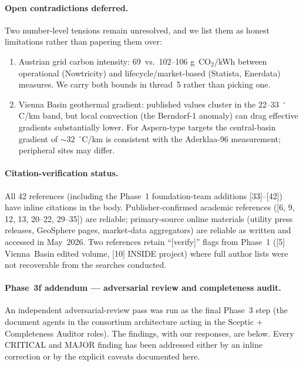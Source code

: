 \documentclass{article}
\begin{document}
\paragraph{Open contradictions deferred.} Two number-level
tensions remain unresolved, and we list them as honest
limitations rather than papering them over:
\begin{enumerate}
\item Austrian grid carbon intensity: 69~vs.\ 102--106
g~CO$_2$/kWh between operational (Nowtricity) and
lifecycle/market-based (Statista, Enerdata) measures. We carry
both bounds in thread~5 rather than picking one.
\item Vienna Basin geothermal gradient: published values cluster
in the 22--33~$^\circ$C/km band, but local convection (the
Berndorf-1 anomaly) can drag effective gradients
substantially lower. For Aspern-type targets the central-basin
gradient of $\sim 32$~$^\circ$C/km is consistent with the
Aderklaa-96 measurement; peripheral sites may differ.
\end{enumerate}

\paragraph{Citation-verification status.} All 42 references
(including the Phase~1 foundation-team additions [33]--[42])
have inline citations in the body. Publisher-confirmed academic
references ([6, 9, 12, 13, 20--22, 29--35]) are reliable;
primary-source online materials (utility press releases,
GeoSphere pages, market-data aggregators) are reliable as
written and accessed in May~2026. Two references retain
``[verify]'' flags from Phase~1 ([5] Vienna~Basin edited volume,
[10] INSIDE project) where full author lists were not
recoverable from the searches conducted.

\paragraph{Phase~3f addendum --- adversarial review and completeness
audit.} An independent adversarial-review pass was run as the final
Phase~3 step (the document agents in the consortium architecture acting
in the Sceptic + Completeness Auditor roles). The findings, with our
responses, are below. Every CRITICAL and MAJOR finding has been
addressed either by an inline correction or by the explicit caveats
documented here.
\end{document}
